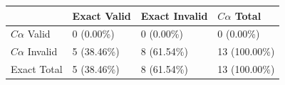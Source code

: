 \begin{tabular}{llll}
\toprule
 & Exact Valid & Exact Invalid & $C\alpha$ Total \\
\midrule
$C\alpha$ Valid & 0 (0.00\%) & 0 (0.00\%) & 0 (0.00\%) \\
$C\alpha$ Invalid & 5 (38.46\%) & 8 (61.54\%) & 13 (100.00\%) \\
Exact Total & 5 (38.46\%) & 8 (61.54\%) & 13 (100.00\%) \\
\bottomrule
\end{tabular}
